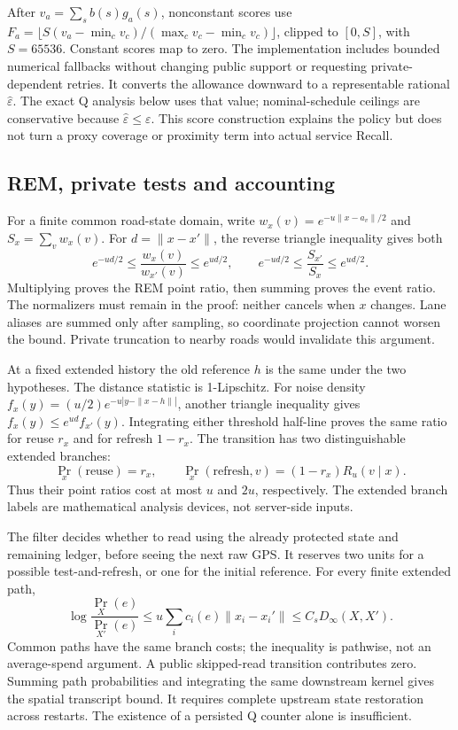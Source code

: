 After $v_a=\sum_sb(s)g_a(s)$, nonconstant scores use
$F_a=\lfloor S(v_a-\min_cv_c)/(\max_cv_c-\min_cv_c)\rfloor$,
clipped to $[0,S]$, with $S=65536$. Constant scores map to zero.
The implementation includes bounded numerical fallbacks without changing
public support or requesting private-dependent retries. It converts the
allowance downward to a representable rational $\widehat\varepsilon$.
The exact Q analysis below uses that value; nominal-schedule ceilings are
conservative because $\widehat\varepsilon\le\varepsilon$.
This score construction explains the policy but does not turn a proxy
coverage or proximity term into actual service Recall.

\subsection{REM, private tests and accounting}
For a finite common road-state domain, write
$w_x(v)=e^{-u\|x-a_v\|/2}$ and $S_x=\sum_vw_x(v)$. For $d=\|x-x'\|$,
the reverse triangle inequality gives both
\[
e^{-ud/2}\le\frac{w_x(v)}{w_{x'}(v)}\le e^{ud/2},
\qquad
e^{-ud/2}\le\frac{S_{x'}}{S_x}\le e^{ud/2}.
\]
Multiplying proves the REM point ratio, then summing proves the event ratio.
The normalizers must remain in the proof: neither cancels when $x$ changes.
Lane aliases are summed only after sampling, so coordinate projection cannot
worsen the bound. Private truncation to nearby roads would invalidate this argument.

At a fixed extended history the old reference $h$ is the same under the two
hypotheses. The distance statistic is 1-Lipschitz. For noise density
$f_x(y)=(u/2)e^{-u|y-\|x-h\||}$, another triangle inequality gives
$f_x(y)\le e^{ud}f_{x'}(y)$. Integrating either threshold half-line proves
the same ratio for reuse $r_x$ and for refresh $1-r_x$. The transition has
two distinguishable extended branches:
\[
\Pr_x(\text{reuse})=r_x,\qquad
\Pr_x(\text{refresh},v)=(1-r_x)R_u(v\mid x).
\]
Thus their point ratios cost at most $u$ and $2u$, respectively. The extended
branch labels are mathematical analysis devices, not server-side inputs.

The filter decides whether to read using the already protected state and
remaining ledger, before seeing the next raw GPS. It reserves two units for
a possible test-and-refresh, or one for the initial reference.
For every finite extended path,
\[
\log\frac{\Pr_X(e)}{\Pr_{X'}(e)}
\le u\sum_i c_i(e)\|x_i-x_i'\|
\le C_sD_\infty(X,X').
\]
Common paths have the same branch costs; the inequality is pathwise, not
an average-spend argument. A public skipped-read transition contributes zero.
Summing path probabilities and integrating the same downstream kernel gives
the spatial transcript bound. It requires complete upstream state restoration
across restarts. The existence of a persisted Q counter alone is insufficient.

